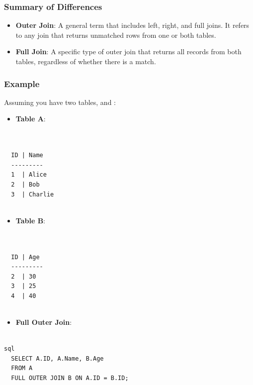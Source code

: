 \begin{botresponse}
\subsubsection{Summary of Differences}

\begin{itemize}
\item \textbf{Outer Join}: A general term that includes left, right, and full joins. It refers to any join that returns unmatched rows from one or both tables.
\item \textbf{Full Join}: A specific type of outer join that returns all records from both tables, regardless of whether there is a match.
\end{itemize}

\subsubsection{Example}

Assuming you have two tables,  and :

\begin{itemize}
\item \textbf{Table A}:
\end{itemize}

\begin{lstlisting}[breaklines=true, breakatwhitespace=false]


  ID | Name
  ---------
  1  | Alice
  2  | Bob
  3  | Charlie
  

\end{lstlisting}

\begin{itemize}
\item \textbf{Table B}:
\end{itemize}

\begin{lstlisting}[breaklines=true, breakatwhitespace=false]


  ID | Age
  ---------
  2  | 30
  3  | 25
  4  | 40
  

\end{lstlisting}

\begin{itemize}
\item \textbf{Full Outer Join}:
\end{itemize}

\begin{lstlisting}[breaklines=true, breakatwhitespace=false]

sql
  SELECT A.ID, A.Name, B.Age
  FROM A
  FULL OUTER JOIN B ON A.ID = B.ID;
  


\end{lstlisting}
\end{botresponse}
